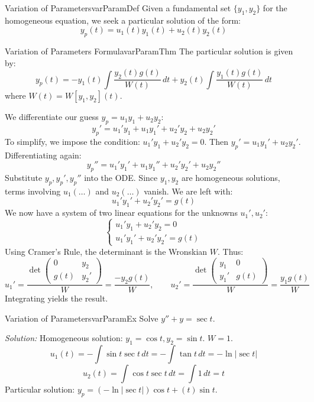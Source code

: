 \documentclass{book}
\newenvironment{Proof}[1][]
  {\begin{ProofTcb}[#1]}
  {\end{ProofTcb}}
\begin{document}
\begin{defn}{Variation of Parameters}{varParamDef}
    Given a fundamental set $\{y_1, y_2\}$ for the homogeneous equation, we seek a particular solution of the form:
    \[
        y_p(t) = u_1(t)y_1(t) + u_2(t)y_2(t)
    \]
\end{defn}

\begin{thm}{Variation of Parameters Formula}{varParamThm}
    The particular solution is given by:
    \[
        y_p(t) = -y_1(t) \int \frac{y_2(t)g(t)}{W(t)} \, dt + y_2(t) \int \frac{y_1(t)g(t)}{W(t)} \, dt
    \]
    where $W(t) = W[y_1, y_2](t)$.
\end{thm}

\begin{Proof}
    We differentiate our guess $y_p = u_1 y_1 + u_2 y_2$:
    \[
        y_p' = u_1' y_1 + u_1 y_1' + u_2' y_2 + u_2 y_2'
    \]
    To simplify, we impose the condition: $u_1' y_1 + u_2' y_2 = 0$.
    Then $y_p' = u_1 y_1' + u_2 y_2'$. Differentiating again:
    \[
        y_p'' = u_1' y_1' + u_1 y_1'' + u_2' y_2' + u_2 y_2''
    \]
    Substitute $y_p, y_p', y_p''$ into the ODE. Since $y_1, y_2$ are homogeneous solutions, terms involving $u_1(\dots)$ and $u_2(\dots)$ vanish. We are left with:
    \[
        u_1' y_1' + u_2' y_2' = g(t)
    \]
    We now have a system of two linear equations for the unknowns $u_1', u_2'$:
    \[
        \begin{cases}
            u_1' y_1 + u_2' y_2 = 0 \\
            u_1' y_1' + u_2' y_2' = g(t)
        \end{cases}
    \]
    Using Cramer's Rule, the determinant is the Wronskian $W$. Thus:
    \[
        u_1' = \frac{\det\begin{pmatrix} 0 & y_2 \\ g(t) & y_2' \end{pmatrix}}{W} = \frac{-y_2 g(t)}{W}, \qquad u_2' = \frac{\det\begin{pmatrix} y_1 & 0 \\ y_1' & g(t) \end{pmatrix}}{W} = \frac{y_1 g(t)}{W}
    \]
    Integrating yields the result.
\end{Proof}

\begin{example}{Variation of Parameters}{varParamEx}
    Solve $y'' + y = \sec t$.

    \emph{Solution:}
    Homogeneous solution: $y_1 = \cos t, y_2 = \sin t$. $W = 1$.
    \[
        u_1(t) = -\int \sin t \sec t \, dt = -\int \tan t \, dt = -\ln|\sec t|
    \]
    \[
        u_2(t) = \int \cos t \sec t \, dt = \int 1 \, dt = t
    \]
    Particular solution: $y_p = (-\ln|\sec t|)\cos t + (t)\sin t$.
\end{example}
\end{document}
